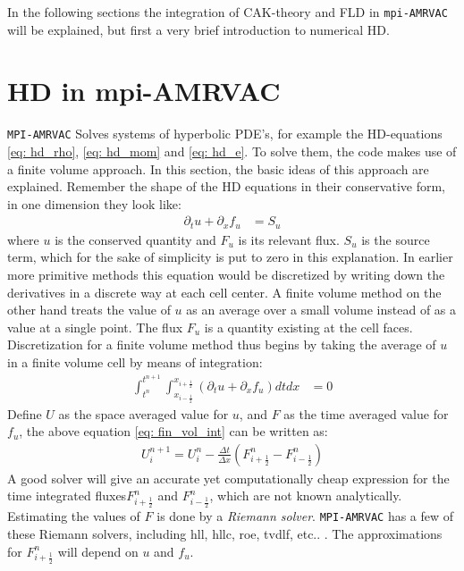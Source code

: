 In the following sections the integration of CAK-theory and FLD in \texttt{mpi-AMRVAC} will be explained, but first a very brief introduction to numerical HD.


\section{HD in mpi-AMRVAC}
\texttt{MPI-AMRVAC} Solves systems of hyperbolic PDE's, for example the HD-equations \eqref{eq: hd_rho}, \eqref{eq: hd_mom} and \eqref{eq: hd_e}. To solve them, the code makes use of a finite volume approach. In this section, the basic ideas of this approach are explained. Remember the shape of the HD equations in their conservative form, in one dimension they look like:
\begin{align}
\partial_t u + \partial_x f_u &= S_u \label{eq: cons form}
\end{align}
where $u$ is the conserved quantity and $F_u$ is its relevant flux. $S_u$ is the source term, which for the sake of simplicity is put to zero in this explanation. In earlier more primitive methods this equation would be discretized by writing down the derivatives in a discrete way at each cell center. A finite volume method on the other hand treats the value of $u$ as an average over a small volume instead of as a value at a single point. The flux $F_u$ is a quantity existing at the cell faces. Discretization for a finite volume method thus begins by taking the average of $u$ in a finite volume cell by means of integration:
\begin{align} 
\int_{t^n}^{t^{n+1}} \int_{x_{i-\frac{1}{2}}}^{x_{i+\frac{1}{2}}} \left( \partial_t u + \partial_x f_u \right) dt dx &= 0  \label{eq: fin_vol_int}
\end{align}
Define $U$ as the space averaged value for $u$, and $F$ as the time averaged value for $f_u$, the above equation \ref{eq: fin_vol_int} can be written as:
\begin{align}
U^{n+1}_i = U^n_i - \frac{\Delta t}{\Delta x}\left(F^n_{i+\frac{1}{2}} - F^n_{i-\frac{1}{2}} \right) 
\end{align}
A good solver will give an accurate yet computationally cheap expression for the time integrated fluxes$F^n_{i+\frac{1}{2}}$ and $F^n_{i-\frac{1}{2}}$, which are not known analytically. Estimating the values of $F$ is done by a \emph{Riemann solver}. \texttt{MPI-AMRVAC} has a few of these Riemann solvers, including  hll, hllc, roe, tvdlf, etc.. \citep{Toth1996}. The approximations for $F^n_{i+\frac{1}{2}}$ will depend on $u$ and $f_u$.\\ 

